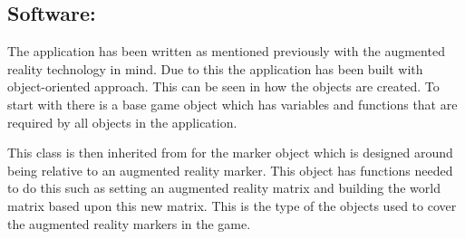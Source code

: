 \subsection{Software:}\label{sc:software}
The application has been written as mentioned previously with the augmented reality technology in mind.
Due to this the application has been built with object-oriented approach.
This can be seen in how the objects are created.
To start with there is a base game object which has variables and functions that are required by all objects in the application.

This class is then inherited from for the marker object which is designed around being relative to an augmented reality marker.
This object has functions needed to do this such as setting an augmented reality matrix and building the world matrix based upon this new matrix.
This is the type of the objects used to cover the augmented reality markers in the game.
